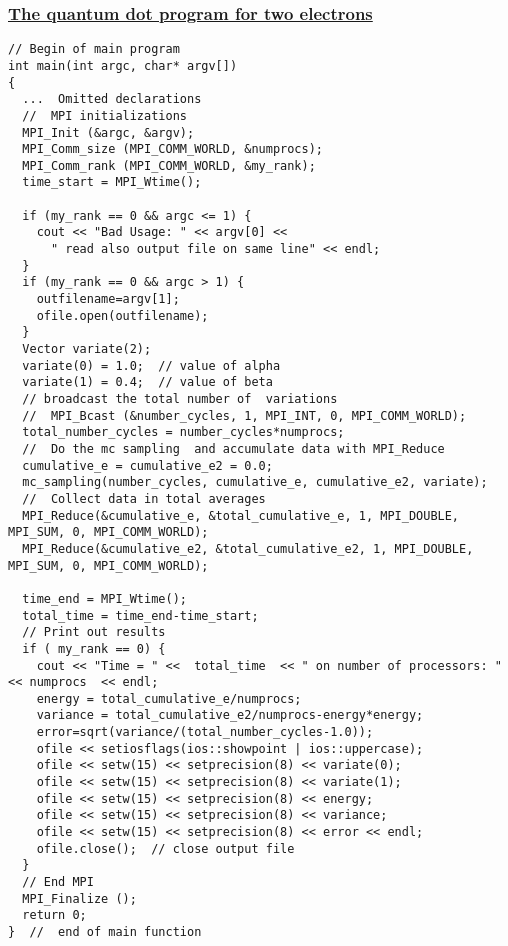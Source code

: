 \documentclass{beamer}
\begin{document}
\begin{frame}
\frametitle{\href{{https://github.com/CompPhysics/ComputationalPhysics2/blob/gh-pages/doc/Programs/ParallelizationMPI/MPIvmcqdot.cpp}}{The quantum dot program for two electrons}}

\begin{block}{}
\begin{verbatim}
// Begin of main program   
int main(int argc, char* argv[])
{
  ...  Omitted declarations
  //  MPI initializations
  MPI_Init (&argc, &argv);
  MPI_Comm_size (MPI_COMM_WORLD, &numprocs);
  MPI_Comm_rank (MPI_COMM_WORLD, &my_rank);
  time_start = MPI_Wtime();

  if (my_rank == 0 && argc <= 1) {
    cout << "Bad Usage: " << argv[0] << 
      " read also output file on same line" << endl;
  }
  if (my_rank == 0 && argc > 1) {
    outfilename=argv[1];
    ofile.open(outfilename); 
  }
  Vector variate(2);
  variate(0) = 1.0;  // value of alpha
  variate(1) = 0.4;  // value of beta
  // broadcast the total number of  variations
  //  MPI_Bcast (&number_cycles, 1, MPI_INT, 0, MPI_COMM_WORLD);
  total_number_cycles = number_cycles*numprocs; 
  //  Do the mc sampling  and accumulate data with MPI_Reduce
  cumulative_e = cumulative_e2 = 0.0;
  mc_sampling(number_cycles, cumulative_e, cumulative_e2, variate);
  //  Collect data in total averages
  MPI_Reduce(&cumulative_e, &total_cumulative_e, 1, MPI_DOUBLE, MPI_SUM, 0, MPI_COMM_WORLD);
  MPI_Reduce(&cumulative_e2, &total_cumulative_e2, 1, MPI_DOUBLE, MPI_SUM, 0, MPI_COMM_WORLD);

  time_end = MPI_Wtime();
  total_time = time_end-time_start;
  // Print out results  
  if ( my_rank == 0) {
    cout << "Time = " <<  total_time  << " on number of processors: "  << numprocs  << endl;
    energy = total_cumulative_e/numprocs;
    variance = total_cumulative_e2/numprocs-energy*energy;
    error=sqrt(variance/(total_number_cycles-1.0));
    ofile << setiosflags(ios::showpoint | ios::uppercase);
    ofile << setw(15) << setprecision(8) << variate(0);
    ofile << setw(15) << setprecision(8) << variate(1);
    ofile << setw(15) << setprecision(8) << energy;
    ofile << setw(15) << setprecision(8) << variance;
    ofile << setw(15) << setprecision(8) << error << endl;
    ofile.close();  // close output file
  }
  // End MPI
  MPI_Finalize ();  
  return 0;
}  //  end of main function
\end{verbatim}


\end{block}
\end{frame}
\end{document}
